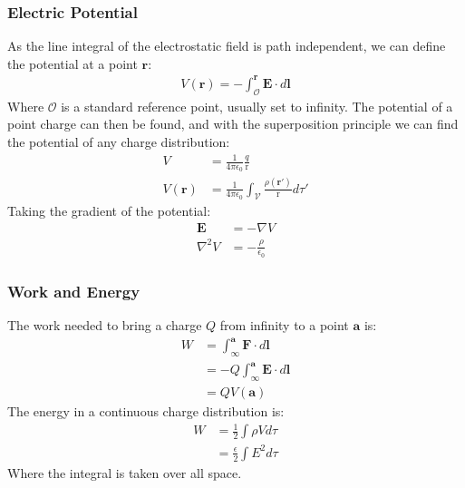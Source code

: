 \documentclass[11pt]{article}
\newcommand{\ve}[1]{\ensuremath{\bm{#1}}}			%
\newcommand{\dr}{\ensuremath{\text{r}}}				%
\begin{document}
\begin{multicols*}{3}
\subsubsection{Electric Potential}
As the line integral of the electrostatic field is path independent, we can define the potential at a point $\ve{r}$:
	\begin{align*}
	V(\ve{r})=-\int_{\mathcal{O}}^{\ve{r}}\ve{E}\cdot d\ve{l}
	\end{align*}
Where $\mathcal{O}$ is a standard reference point, usually set to infinity. The potential of a point charge can then be found, and with the superposition principle we can find the potential of any charge distribution:
	\begin{align*}
	V&=\frac{1}{4\pi\epsilon_0}\frac{q}{\dr}\\
	V(\ve{r})&=\frac{1}{4\pi\epsilon_0}\int_\mathcal{V}\frac{\rho(\ve{r'})}{\dr} d\tau'
	\end{align*}
Taking the gradient of the potential:
	\begin{align*}
	\ve{E}&=-\nabla V\\
	\nabla^2V&=-\frac{\rho}{\epsilon_0}
	\end{align*}

\subsubsection{Work and Energy}
The work needed to bring a charge $Q$ from infinity to a point $\ve{a}$ is:
	\begin{align*}
	W&=\int_{\infty}^{\ve{a}} \ve{F}\cdot d\ve{l}\\
	&=-Q\int_{\infty}^{\ve{a}} \ve{E}\cdot d\ve{l}\\
	&=QV(\ve{a})
	\end{align*}
The energy in a continuous charge distribution is:
	\begin{align*}
	W&=\frac{1}{2}\int \rho V d\tau\\
	&=\frac{\epsilon}{2} \int E^2 d\tau
	\end{align*}
Where the integral is taken over all space.

\end{multicols*}
\end{document}
